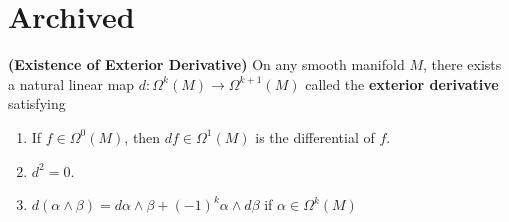 \documentclass{report}
\begin{document}
\section{Archived}
\begin{theorem}
\textbf{(Existence of Exterior Derivative)} On any smooth manifold $M$, there exists a natural linear map  $d:\Omega^k(M)\rightarrow \Omega^{k+1}(M)$ called the \textbf{exterior derivative} satisfying 
\begin{enumerate}[label=(\alph*)]
  \item If $f \in \Omega^0(M)$, then $df\in \Omega^1(M)$ is the differential of $f$. 
  \item $d^2=0$.
  \item  $d (\alpha \wedge  \beta  )=d\alpha \wedge  \beta +(-1)^k \alpha \wedge  d\beta   $ if $ \alpha  \in \Omega^k(M)$
\end{enumerate}
\end{theorem}
\end{document}
